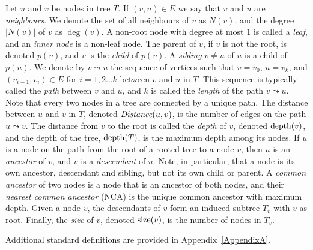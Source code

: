 	Let $u$ and $v$ be nodes in  tree $T$. 
	If $(v,u) \in E$  we say that $v$ and $u$ are  \emph{neighbours}. We denote  the set of all neighbours of $v$ as $N(v)$, and the degree $\vert N(v) \vert$ of $v$ as $\deg(v)$.  A non-root node with degree at most $1$ is called a  \emph{leaf}, and an \emph{inner node} is a non-leaf node. The parent of $v$, if $v$ is not the root, is denoted $p(v)$, and $v$ is the \emph{child} of $p(v)$.  A \emph{sibling} $v \neq u$ of $u$  is a child of $p(u)$.
	We denote by $v \leadsto u$ the  sequence   of vertices such that $v = v_0$, $u = v_k$, and $(v_{i-1},v_{i})\in E$ for $ i= 1,2 \dots k$ between $v$ and $u$ in $T$. 
	This sequence is typically called the \emph{path} between $v$ and $u$, and $k$ is called the \emph{length} of the path $v \leadsto u$. Note that   every two nodes in a tree are connected by a unique path.
The distance between $u$ and $v$ in $T$, denoted $\emph{Distance}(u, v)$, is the number of edges on the path  $u \leadsto v $. The distance from  $v$ to the root is called the \emph{depth} of $v$, denoted $\operatorname{depth}(v)$, and the depth of the tree, $\operatorname{depth}(T)$, is the maximum depth among its nodes.
	If $u$ is a node on the path from the root of a rooted tree to a node $v$, then $u$ is an \emph{ancestor} of $v$, and $v$ is a \emph{descendant} of $u$. Note, in particular, that a node is its own ancestor, descendant and sibling, but not its own child or parent. A \emph{common ancestor} of two nodes is a node that is an ancestor of both nodes, and their \emph{nearest common ancestor} (NCA) is the unique common ancestor with maximum depth. Given a node $v$, the descendants of $v$ form an induced subtree $T_v$ with $v$ as root.  Finally, the \emph{size} of $v$, denoted $\operatorname{size}(v)$, is the number of nodes in $T_v$.
	
	Additional standard definitions are provided in Appendix~\ref{AppendixA}.
